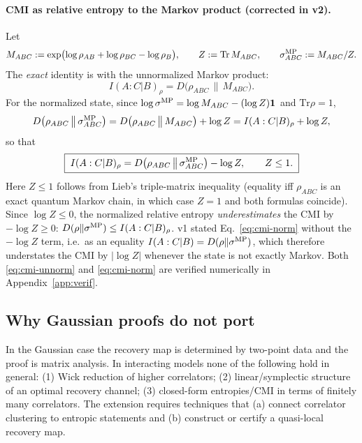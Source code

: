 \documentclass[11pt]{article}
\newcommand{\Tr}{\mathrm{Tr}}
\begin{document}
\paragraph{CMI as relative entropy to the Markov product (corrected in v2).}
Let
\begin{equation}
M_{ABC} := \exp\bigl(\log\rho_{AB} + \log\rho_{BC} - \log\rho_B\bigr),
\qquad
Z := \Tr\, M_{ABC},
\qquad
\sigma^{\rm MP}_{ABC} := M_{ABC}/Z .
\label{eq:MP}
\end{equation}
The \emph{exact} identity is with the unnormalized Markov product:
\begin{equation}
I(A:C|B)_\rho = D\bigl(\rho_{ABC}\,\big\|\, M_{ABC}\bigr).
\label{eq:cmi-unnorm}
\end{equation}
For the normalized state, since
$\log\sigma^{\rm MP} = \log M_{ABC} - (\log Z)\mathbf{1}$ and $\Tr\rho = 1$,
\begin{equation}
D\bigl(\rho_{ABC}\,\big\|\, \sigma^{\rm MP}_{ABC}\bigr)
= D\bigl(\rho_{ABC}\,\big\|\, M_{ABC}\bigr) + \log Z
= I(A:C|B)_\rho + \log Z,
\end{equation}
so that
\begin{equation}
\boxed{\;
I(A:C|B)_\rho
= D\bigl(\rho_{ABC}\,\big\|\, \sigma^{\rm MP}_{ABC}\bigr) - \log Z,
\qquad Z \le 1. \;}
\label{eq:cmi-norm}
\end{equation}
Here $Z \le 1$ follows from Lieb's triple-matrix inequality \cite{Lieb73}
(equality iff $\rho_{ABC}$ is an exact quantum Markov chain, in which case
$Z = 1$ and both formulas coincide). Since $\log Z \le 0$, the normalized
relative entropy \emph{underestimates} the CMI by $-\log Z \ge 0$:
$D(\rho\|\sigma^{\rm MP}) \le I(A:C|B)_\rho$. v1 stated
Eq.~\eqref{eq:cmi-norm} without the $-\log Z$ term, i.e.\ as an equality
$I(A:C|B) = D(\rho\|\sigma^{\rm MP})$, which therefore understates the CMI by
$|\log Z|$ whenever the state is not exactly Markov. Both
\eqref{eq:cmi-unnorm} and \eqref{eq:cmi-norm} are verified numerically in
Appendix~\ref{app:verif}.

\subsection{Why Gaussian proofs do not port}

In the Gaussian case the recovery map is determined by two-point data and the
proof is matrix analysis. In interacting models none of the following hold in
general: (1) Wick reduction of higher correlators; (2) linear/symplectic
structure of an optimal recovery channel; (3) closed-form entropies/CMI in
terms of finitely many correlators. The extension requires techniques that
(a) connect correlator clustering to entropic statements and (b) construct or
certify a quasi-local recovery map.
\end{document}
